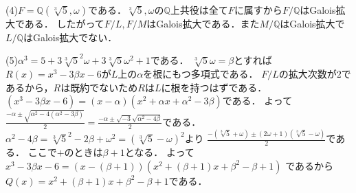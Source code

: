 \documentclass[
		book,
		head_space=20mm,
		foot_space=20mm,
		gutter=10mm,
		line_length=190mm
]{jlreq}
\begin{document}
(4)$F=\mathbb{Q}(\sqrt[3]{5},\omega)$である．$\sqrt[3]{5},\omega$の$\mathbb{Q}$上共役は全て$F$に属すから$F/\mathbb{Q}$はGalois拡大である．
したがって$F/L,F/M$はGalois拡大である．また$M/\mathbb{Q}$はGalois拡大で$L/\mathbb{Q}$はGalois拡大でない．

(5)$\alpha^3=5+3\sqrt[3]{5}^2\omega+3\sqrt[3]{5}\omega^2+1$である．
$\sqrt[3]{5}\omega=\beta$とすれば$R(x)=x^3-3\beta x -6$が$L$上の$\alpha$を根にもつ多項式である．
$F/L$の拡大次数が$2$であるから，$R$は既約でないため$R$は$L$に根を持つはずである．
$(x^3-3\beta x-6)=(x-\alpha)(x^2+\alpha x +\alpha^2-3\beta)$である．
よって$\frac{-\alpha\pm\sqrt{\alpha^2-4(\alpha^2-3\beta)}}{2}=\frac{-\alpha\pm \sqrt{-3}\sqrt{\alpha^2-4\beta}}{2}$である．
$\alpha^2-4\beta=\sqrt[3]{5}^2-2\beta+\omega^2=(\sqrt[3]{5}-\omega)^2$より
$\frac{-(\sqrt[3]{5}+\omega)\pm(2\omega+1)(\sqrt[3]{5}-\omega)}{2}$である．
ここで$+$のときは$\beta+1$となる．
よって$x^3-3\beta x-6=(x-(\beta+1))(x^2+(\beta+1)x+\beta^2-\beta+1)$
であるから$Q(x)=x^2+(\beta+1)x+\beta^2-\beta+1$である．
\end{document}
